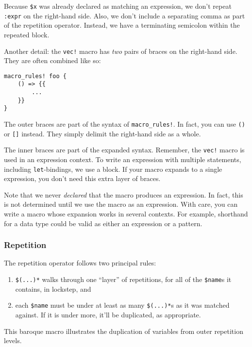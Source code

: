 \documentclass[a4paper,]{book}
\providecommand{\tightlist}{%
  \setlength{\itemsep}{0pt}\setlength{\parskip}{0pt}}
\begin{document}
Because \texttt{\$x} was already declared as matching an expression, we
don't repeat \texttt{:expr} on the right-hand side. Also, we don't
include a separating comma as part of the repetition operator. Instead,
we have a terminating semicolon within the repeated block.

Another detail: the \texttt{vec!} macro has \emph{two} pairs of braces
on the right-hand side. They are often combined like so:

\begin{verbatim}
macro_rules! foo {
    () => {{
        ...
    }}
}
\end{verbatim}

The outer braces are part of the syntax of \texttt{macro\_rules!}. In
fact, you can use \texttt{()} or \texttt{{[}{]}} instead. They simply
delimit the right-hand side as a whole.

The inner braces are part of the expanded syntax. Remember, the
\texttt{vec!} macro is used in an expression context. To write an
expression with multiple statements, including \texttt{let}-bindings, we
use a block. If your macro expands to a single expression, you don't
need this extra layer of braces.

Note that we never \emph{declared} that the macro produces an
expression. In fact, this is not determined until we use the macro as an
expression. With care, you can write a macro whose expansion works in
several contexts. For example, shorthand for a data type could be valid
as either an expression or a pattern.

\subsubsection{Repetition}\label{repetition}

The repetition operator follows two principal rules:

\begin{enumerate}
\def\labelenumi{\arabic{enumi}.}
\tightlist
\item
  \texttt{\$(...)*} walks through one ``layer'' of repetitions, for all
  of the \texttt{\$name}s it contains, in lockstep, and
\item
  each \texttt{\$name} must be under at least as many \texttt{\$(...)*}s
  as it was matched against. If it is under more, it'll be duplicated,
  as appropriate.
\end{enumerate}

This baroque macro illustrates the duplication of variables from outer
repetition levels.
\end{document}
